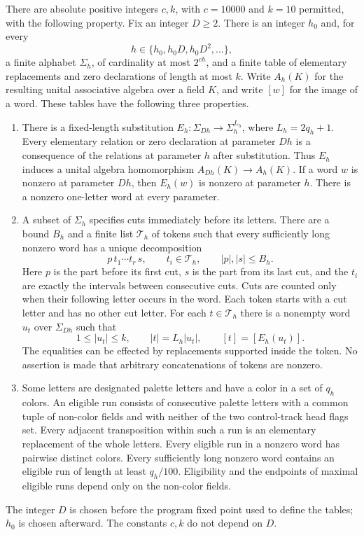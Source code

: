 \begin{proposition}\label{prop:hierarchy}
There are absolute positive integers $c,k$, with $c=10000$ and $k=10$
permitted, with the following property.  Fix an integer $D\geq2$.
There is an integer $h_0$ and, for every
\[
 h\in\{h_0,h_0D,h_0D^2,\ldots\},
\]
a finite alphabet $\Sigma_h$, of cardinality at most $2^{ch}$, and a
finite table of elementary replacements and zero declarations of
length at most $k$.  Write $A_h(K)$ for the resulting unital
associative algebra over a field $K$, and write $[w]$ for the image of a
word.  These tables have the following three properties.
\begin{enumerate}
\item\label{fr:prop-encoding}
There is a fixed-length substitution
$E_h:\Sigma_{Dh}\longrightarrow\Sigma_h^{L_h}$, where
$L_h=2q_h+1$.  Every elementary relation or zero declaration at
parameter $Dh$ is a consequence of the relations at parameter $h$
after substitution.  Thus $E_h$ induces a unital algebra homomorphism
$A_{Dh}(K)\longrightarrow A_h(K)$.  If a word $w$ is nonzero at
parameter $Dh$, then $E_h(w)$ is nonzero at parameter $h$.
There is a nonzero one-letter word at every parameter.
\item\label{fr:prop-tokens}
A subset of $\Sigma_h$ specifies cuts immediately before its letters.
There are a bound $B_h$ and a finite list $\mathcal T_h$ of tokens such
that every sufficiently long nonzero word has a unique decomposition
\[
 p\,t_1\cdots t_r\,s,
 \qquad t_i\in\mathcal T_h,\qquad |p|,|s|\leq B_h.
\]
Here $p$ is the part before its first cut, $s$ is the part from its last
cut, and the $t_i$ are exactly the intervals between consecutive cuts.
Cuts are counted only when their following letter occurs in the word.
Each token starts with a cut letter and has no other cut letter.
For each $t\in\mathcal T_h$ there is a nonempty word $u_t$ over
$\Sigma_{Dh}$ such that
\[
 1\leq |u_t|\leq k,
 \qquad |t|=L_h|u_t|,
 \qquad [t]=[E_h(u_t)].
\]
The equalities can be effected by replacements supported inside the
token.  No assertion is made that arbitrary concatenations of tokens
are nonzero.
\item\label{fr:prop-runs}
Some letters are designated palette letters and have a color in a set
of $q_h$ colors.  An eligible run consists of consecutive palette
letters with a common tuple of non-color fields and with neither of
the two control-track head flags set.  Every adjacent transposition
within such a run is an elementary replacement of the whole letters.
Every eligible run in a nonzero word has pairwise distinct colors.
Every sufficiently long nonzero word contains an eligible run of
length at least $q_h/100$.  Eligibility and the endpoints of maximal
eligible runs depend only on the non-color fields.
\end{enumerate}
The integer $D$ is chosen before the program fixed point used to
define the tables; $h_0$ is chosen afterward.  The constants $c,k$ do
not depend on $D$.
\end{proposition}

